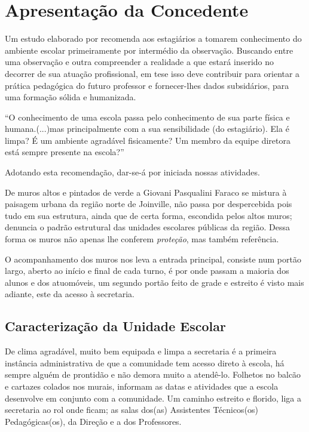 \chapter{Apresentação da Concedente}
\label{cap: aprConcedente}

Um estudo elaborado por \cite{CARVALHOAMP:2012a} recomenda aos estagiários a tomarem conhecimento do ambiente escolar primeiramente por intermédio da observação. Buscando entre uma observação e outra compreender a realidade a que estará inserido no decorrer de sua atuação profissional, em tese isso deve contribuir para orientar a prática pedagógica do futuro professor e fornecer-lhes dados subsidários, para uma formação sólida e humanizada.
\begin{citacao}
``O conhecimento de uma escola passa pelo conhecimento de sua parte física e humana.(...)mas principalmente com a sua sensibilidade (do estagiário). Ela é limpa? É um ambiente agradável fisicamente? Um membro da equipe diretora está sempre presente na escola?'' 
\end{citacao}
Adotando esta recomendação, dar-se-á por iniciada nossas atividades.

De muros altos e pintados de verde a Giovani Pasqualini Faraco se mistura à paisagem urbana da região norte de Joinville, não passa por despercebida pois tudo em sua estrutura, ainda que de certa forma, escondida pelos altos muros; denuncia o padrão estrutural das unidades escolares públicas da região. Dessa forma os muros não apenas lhe conferem \emph{proteção}, mas também referência.

O acompanhamento dos muros nos leva a entrada principal, consiste num portão largo, aberto ao início e final de cada turno, é por onde passam a maioria dos alunos e dos atuomóveis, um segundo portão feito de grade e estreito é visto mais adiante, este da acesso à secretaria.

\section{Caracterização da Unidade Escolar}
De clima agradável, muito bem equipada e limpa a secretaria é a primeira instância administrativa de que a comunidade tem acesso direto à escola, há sempre alguém de prontidão e não demora muito a atendê-lo. Folhetos no balcão e cartazes colados nos murais, informam as datas e atividades que a escola desenvolve em conjunto com a comunidade. Um caminho estreito e florido, liga a secretaria ao rol onde ficam; as salas dos(as) Assistentes Técnicos(os) Pedagógicas(os), da Direção e a dos Professores.

